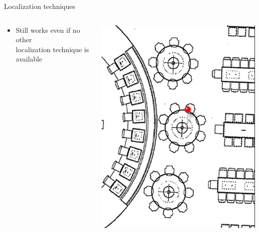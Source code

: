 \documentclass[11pt]{beamer}
\begin{document}
\begin{frame}{Localization techniques}
\begin{columns}
\begin{column}{0.65\textwidth}
      \begin{itemize}
        \item Still works even if no other\\localization technique is available
      \end{itemize}

    \end{column}

    \hfill
    \begin{column}{0.25\textwidth}
      \includegraphics[width=\textwidth]{manualpinpoint}
    \end{column}

  \end{columns}

\end{frame}
\end{document}
